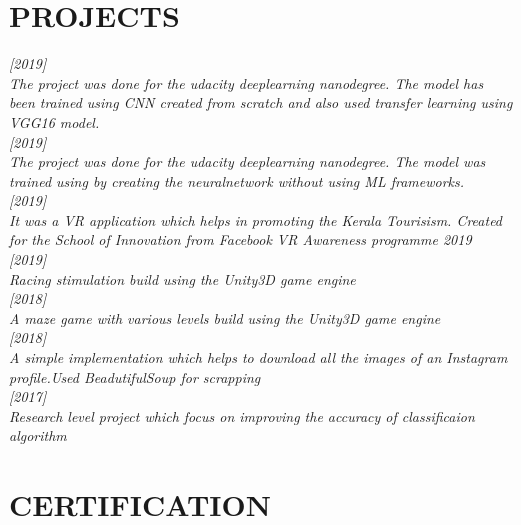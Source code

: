 \documentclass[margin]{res}
\begin{document}
\begin{resume}
\section{PROJECTS} 

    \sl
    \normalfont {} \hfill [2019] \\ 
     The project was done for the udacity deeplearning nanodegree. The model has been trained using CNN created from scratch and also used transfer learning using VGG16 model. \\
    \normalfont {} \hfill [2019] \\ 
     The project was done for the udacity deeplearning nanodegree. The model was trained using by creating the neuralnetwork without using ML frameworks.
     \\   
    \normalfont {} \hfill [2019]\\ 
     It was a VR application which helps in promoting the Kerala Tourisism. Created for the  School of Innovation from Facebook VR Awareness programme 2019 
     \\     \normalfont {} \hfill [2019] \\ 
     Racing stimulation build using the Unity3D game engine
     \\     \normalfont {} \hfill [2018] \\ 
     A maze game with various levels build using the Unity3D game engine
     \\    \normalfont {} \hfill [2018]\\
     A simple implementation which helps to download all the images of an Instagram profile.Used BeadutifulSoup for scrapping\\
    \normalfont {} \hfill [2017] \\ Research level project which focus on improving the accuracy of classificaion algorithm



\section{CERTIFICATION}
   

\end{resume}
\end{document}
